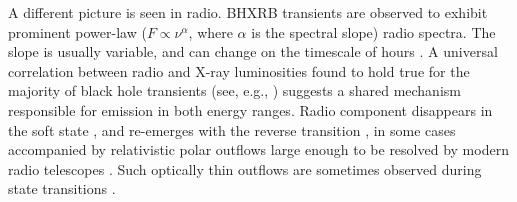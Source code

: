 A different picture is seen in radio.
\gls{BHXRB} transients are observed to exhibit prominent power-law ($F \propto \nu^\alpha$, where $\alpha$ is the spectral slope) radio spectra.
The slope is usually variable, and can change on the timescale of hours \citep[e.g.,][]{Gandhi2011}.
A universal correlation between radio and X-ray luminosities found to hold true for the majority of black hole transients (see, e.g., \citealt{Gallo2003, Merloni2003, Corbel2013, Gallo2014}) suggests a shared mechanism responsible for emission in both energy ranges.
Radio component disappears in the soft state \citep{Russell2011a}, and re-emerges with the reverse transition \citep[e.g.,][]{Corbel2000}, in some cases accompanied by relativistic polar outflows large enough to be resolved by modern radio telescopes \citep[e.g., ][]{Bright2020}.
Such optically thin outflows are sometimes observed during state transitions \citep{Kalemci2013}.


